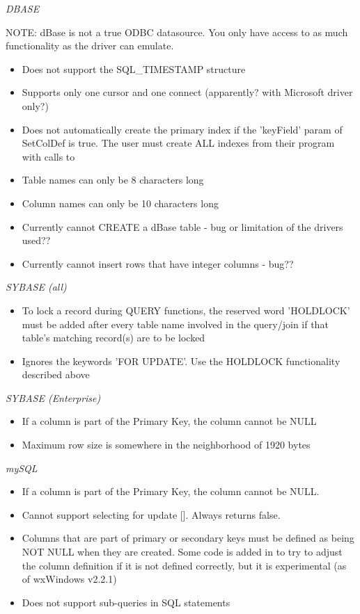{\it DBASE}

NOTE: dBase is not a true ODBC datasource. You only have access to as much 
functionality as the driver can emulate.

\begin{itemize}\itemsep=0pt
\item Does not support the SQL\_TIMESTAMP structure
\item Supports only one cursor and one connect (apparently? with Microsoft driver only?)
\item Does not automatically create the primary index if the 'keyField' param of SetColDef is true. The user must create ALL indexes from their program with calls to 
\item Table names can only be 8 characters long
\item Column names can only be 10 characters long
\item Currently cannot CREATE a dBase table - bug or limitation of the drivers used??
\item Currently cannot insert rows that have integer columns - bug??
\end{itemize}

{\it SYBASE (all)}
\begin{itemize}\itemsep=0pt
\item To lock a record during QUERY functions, the reserved word 'HOLDLOCK' must be added after every table name involved in the query/join if that table's matching record(s) are to be locked
\item Ignores the keywords 'FOR UPDATE'. Use the HOLDLOCK functionality described above
\end{itemize}

{\it SYBASE (Enterprise)}
\begin{itemize}\itemsep=0pt
\item If a column is part of the Primary Key, the column cannot be NULL
\item Maximum row size is somewhere in the neighborhood of 1920 bytes
\end{itemize}

{\it mySQL}
\begin{itemize}\itemsep=0pt
\item If a column is part of the Primary Key, the column cannot be NULL.
\item Cannot support selecting for update []. Always returns false.
\item Columns that are part of primary or secondary keys must be defined as being NOT NULL when they are created. Some code is added in  to try to adjust the column definition if it is not defined correctly, but it is experimental (as of wxWindows v2.2.1)
\item Does not support sub-queries in SQL statements
\end{itemize}

